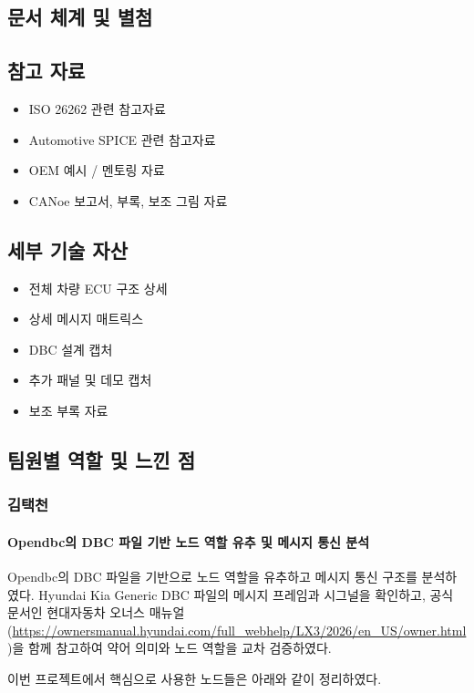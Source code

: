 \documentclass[11pt,a4paper]{article}
\begin{document}
\subsection{문서 체계 및 별첨}
\subsection{참고 자료}
\begin{itemize}
  \item ISO 26262 관련 참고자료
  \item Automotive SPICE 관련 참고자료
  \item OEM 예시 / 멘토링 자료
  \item CANoe 보고서, 부록, 보조 그림 자료
\end{itemize}

\subsection{세부 기술 자산}
\begin{itemize}
  \item 전체 차량 ECU 구조 상세
  \item 상세 메시지 매트릭스
  \item DBC 설계 캡처
  \item 추가 패널 및 데모 캡처
  \item 보조 부록 자료
\end{itemize}

\clearpage
\subsection{팀원별 역할 및 느낀 점}

\subsubsection{김택천}
\paragraph{Opendbc의 DBC 파일 기반 노드 역할 유추 및 메시지 통신 분석}
Opendbc의 DBC 파일을 기반으로 노드 역할을 유추하고 메시지 통신 구조를 분석하였다. Hyundai Kia Generic DBC 파일의 메시지 프레임과 시그널을 확인하고, 공식 문서인 현대자동차 오너스 매뉴얼(\url{https://ownersmanual.hyundai.com/full_webhelp/LX3/2026/en_US/owner.html})을 함께 참고하여 약어 의미와 노드 역할을 교차 검증하였다.

이번 프로젝트에서 핵심으로 사용한 노드들은 아래와 같이 정리하였다.
\end{document}
